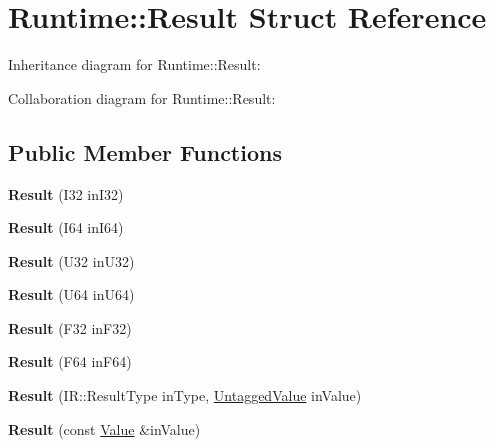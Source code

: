 \hypertarget{struct_runtime_1_1_result}{}\section{Runtime\+:\+:Result Struct Reference}
\label{struct_runtime_1_1_result}


Inheritance diagram for Runtime\+:\+:Result\+:


Collaboration diagram for Runtime\+:\+:Result\+:
\subsection*{Public Member Functions}
\begin{DoxyCompactItemize}
\item 
\mbox{\label{struct_runtime_1_1_result_aea4bc0fdfe750d7df1f57b81fdc6e9cd}} 
{\bfseries Result} (I32 in\+I32)
\item 
\mbox{\label{struct_runtime_1_1_result_ab5cd4c304a1745aa23221cb77764fd17}} 
{\bfseries Result} (I64 in\+I64)
\item 
\mbox{\label{struct_runtime_1_1_result_aacbca2fecfa83a1fce4be96a470123f2}} 
{\bfseries Result} (U32 in\+U32)
\item 
\mbox{\label{struct_runtime_1_1_result_a63128f4e4bbeb94a33217ccfc0b379ee}} 
{\bfseries Result} (U64 in\+U64)
\item 
\mbox{\label{struct_runtime_1_1_result_a322bb44a6e3a28c71affafc2f636c3a9}} 
{\bfseries Result} (F32 in\+F32)
\item 
\mbox{\label{struct_runtime_1_1_result_adffc8e377e0c5afad643c15b6b2f1a57}} 
{\bfseries Result} (F64 in\+F64)
\item 
\mbox{\label{struct_runtime_1_1_result_a299aee91307e623fd0fb759de902ec0b}} 
{\bfseries Result} (I\+R\+::\+Result\+Type in\+Type, \mbox{\hyperlink{struct_runtime_1_1_untagged_value}{Untagged\+Value}} in\+Value)
\item 
\mbox{\label{struct_runtime_1_1_result_a228673de20cebea4e99477eef66fc39e}} 
{\bfseries Result} (const \mbox{\hyperlink{struct_runtime_1_1_value}{Value}} \&in\+Value)
\end{DoxyCompactItemize}
